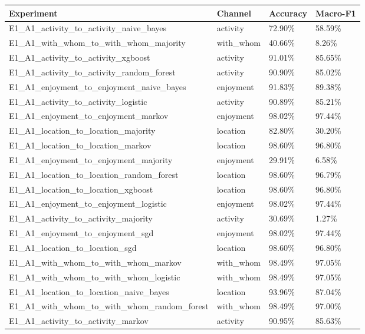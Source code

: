 \begin{tabular}{llll}
\toprule
Experiment & Channel & Accuracy & Macro-F1 \\
\midrule
E1\_A1\_activity\_to\_activity\_naive\_bayes & activity & 72.90\% & 58.59\% \\
E1\_A1\_with\_whom\_to\_with\_whom\_majority & with_whom & 40.66\% & 8.26\% \\
E1\_A1\_activity\_to\_activity\_xgboost & activity & 91.01\% & 85.65\% \\
E1\_A1\_activity\_to\_activity\_random\_forest & activity & 90.90\% & 85.02\% \\
E1\_A1\_enjoyment\_to\_enjoyment\_naive\_bayes & enjoyment & 91.83\% & 89.38\% \\
E1\_A1\_activity\_to\_activity\_logistic & activity & 90.89\% & 85.21\% \\
E1\_A1\_enjoyment\_to\_enjoyment\_markov & enjoyment & 98.02\% & 97.44\% \\
E1\_A1\_location\_to\_location\_majority & location & 82.80\% & 30.20\% \\
E1\_A1\_location\_to\_location\_markov & location & 98.60\% & 96.80\% \\
E1\_A1\_enjoyment\_to\_enjoyment\_majority & enjoyment & 29.91\% & 6.58\% \\
E1\_A1\_location\_to\_location\_random\_forest & location & 98.60\% & 96.79\% \\
E1\_A1\_location\_to\_location\_xgboost & location & 98.60\% & 96.80\% \\
E1\_A1\_enjoyment\_to\_enjoyment\_logistic & enjoyment & 98.02\% & 97.44\% \\
E1\_A1\_activity\_to\_activity\_majority & activity & 30.69\% & 1.27\% \\
E1\_A1\_enjoyment\_to\_enjoyment\_sgd & enjoyment & 98.02\% & 97.44\% \\
E1\_A1\_location\_to\_location\_sgd & location & 98.60\% & 96.80\% \\
E1\_A1\_with\_whom\_to\_with\_whom\_markov & with_whom & 98.49\% & 97.05\% \\
E1\_A1\_with\_whom\_to\_with\_whom\_logistic & with_whom & 98.49\% & 97.05\% \\
E1\_A1\_location\_to\_location\_naive\_bayes & location & 93.96\% & 87.04\% \\
E1\_A1\_with\_whom\_to\_with\_whom\_random\_forest & with_whom & 98.49\% & 97.00\% \\
E1\_A1\_activity\_to\_activity\_markov & activity & 90.95\% & 85.63\% \\

\end{tabular}
